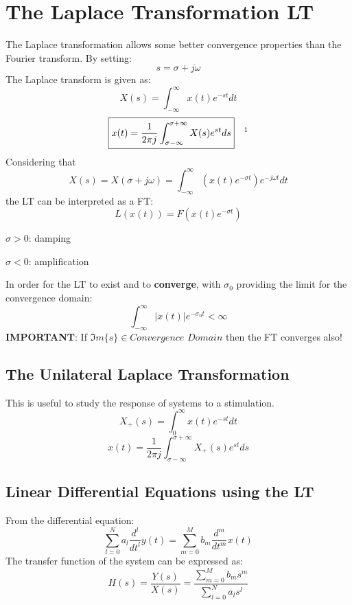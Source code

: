 \documentclass[10pt,a4paper]{article}
\begin{document}
\section{The Laplace Transformation LT}
The Laplace transformation allows some better convergence properties than the Fourier transform. By setting:
$$
s = \sigma + j\omega 
$$
The Laplace transform is given as:
$$
\boxed{
X(s) = \int_{-\infty}^{\infty} x(t)e^{-st}dt}
$$
$$
\boxed{
x(t) = \frac{1}{2\pi j} \int_{\sigma-\infty}^{\sigma+\infty} X(s)e^{st}ds}
\quad \textbf{\footnotemark}
$$
Considering that
$$
X(s) = X(\sigma+j\omega) = \int_{-\infty}^{\infty} (x(t)e^{-\sigma t})e^{-j\omega t}dt
$$
the LT can be interpreted as a FT:
$$
L(x(t)) = F(x(t)e^{-\sigma t})
$$
\begin{list}{•}{}
\item $\sigma > 0$: damping
\item $\sigma < 0$: amplification
\end{list}
In order for the LT to exist and to \textbf{converge}, with $\sigma_0$ providing the limit for the convergence domain: 
$$
\int_{-\infty}^{\infty} \vert x(t) \vert e^{-\sigma_0t} < \infty
$$
\textbf{IMPORTANT}: If $\Im m\{s\} \in \textit{Convergence Domain}$ then the FT converges also!

\subsection{The Unilateral Laplace Transformation}
This is useful to study the response of systems to a stimulation.
$$
X_+(s) = \int_{0}^{\infty} x(t)e^{-st}dt
$$
$$
x(t) = \frac{1}{2\pi j} \int_{\sigma-\infty}^{\sigma+\infty} X_+(s)e^{st}ds
$$
\subsection{Linear Differential Equations using the LT}
From the differential equation:
$$
\sum_{l=0}^{N} a_l \frac{d^l}{dt^l}y(t) = \sum_{m=0}^{M} b_m \frac{d^m}{dt^m}x(t) 
$$
The transfer function of the system can be expressed as:
$$
\boxed{
H(s) = \frac{Y(s)}{X(s)} = \frac{\sum_{m=0}^{M} b_m s^m}{\sum_{l=0}^{N} a_l s^l}
}
$$
\end{document}
